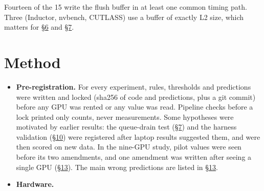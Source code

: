 \documentclass[11pt,a4paper]{article}
\providecommand{\tightlist}{\setlength{\itemsep}{0pt}\setlength{\parskip}{0pt}}
\begin{document}
Fourteen of the 15 write the flush buffer in at least one common timing path. Three (Inductor, nvbench,
CUTLASS) use a buffer of exactly L2 size, which matters for \hyperref[what-removes-the-residue-and-what-does-not]{\S{}6} and \hyperref[pitfall-2-queue-drain]{\S{}7}.

\section{Method}\label{method}

\begin{itemize}
\tightlist
\item
  \textbf{Pre-registration.} For every experiment, rules, thresholds and predictions were written and locked (sha256
  of code and predictions, plus a git commit) before any GPU was rented or any value was read. Pipeline checks
  before a lock printed only counts, never measurements. Some hypotheses were motivated by earlier results: the
  queue-drain test (\hyperref[pitfall-2-queue-drain]{\S{}7}) and the harness validation (\hyperref[cleanbench]{\S{}10}) were registered after laptop results suggested them, and
  were then scored on new data. In the nine-GPU study, pilot values were seen before its two amendments, and one
  amendment was written after seeing a single GPU (\hyperref[negative-results-deviations-and-limitations]{\S{}13}). The main wrong predictions are listed in \hyperref[negative-results-deviations-and-limitations]{\S{}13}.
\item
  \textbf{Hardware.}


\end{itemize}
\end{document}
